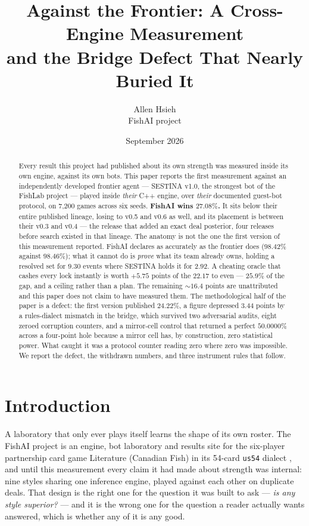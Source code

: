 \documentclass[11pt]{article}
\title{Against the Frontier: A Cross-Engine Measurement\\ and the Bridge Defect That Nearly Buried It}
\author{Allen Hsieh\\[2pt] {\small FishAI project}}
\date{September 2026}
\newcommand{\code}[1]{\texttt{#1}}
\newcommand{\usff}{\code{us54}}
\begin{document}
\maketitle

\begin{abstract}
\noindent
Every result this project had published about its own strength was measured inside its own engine,
against its own bots. This paper reports the first measurement against an independently developed
frontier agent --- SESTINA v1.0, the strongest bot of the FishLab project \cite{fishlab} --- played
inside \emph{their} C++ engine, over \emph{their} documented guest-bot protocol, on 7{,}200 games
across six seeds. \textbf{FishAI wins $27.08\%$.} It sits below their entire published lineage,
losing to v0.5 and v0.6 as well, and its placement is between their v0.3 and v0.4 --- the release
that added an exact deal posterior, four releases before search existed in that lineage.
The anatomy is not the one the first version of this measurement reported. FishAI declares as
accurately as the frontier does ($98.42\%$ against $98.46\%$); what it cannot do is \emph{prove}
what its team already owns, holding a resolved set for $9.30$ events where SESTINA holds it for
$2.92$. A cheating oracle that cashes every lock instantly is worth $+5.75$ points of the $22.17$
to even --- $25.9\%$ of the gap, and a ceiling rather than a plan. The remaining ${\sim}16.4$ points
are unattributed and this paper does not claim to have measured them. The methodological half of
the paper is a defect: the first version published $24.22\%$, a figure depressed $3.44$ points by a
rules-dialect mismatch in the bridge, which survived two adversarial audits, eight zeroed corruption
counters, and a mirror-cell control that returned a perfect $50.0000\%$ across a four-point hole
because a mirror cell has, by construction, zero statistical power. What caught it was a protocol
counter reading zero where zero was impossible. We report the defect, the withdrawn numbers, and
three instrument rules that follow.
\end{abstract}

\section{Introduction}
\label{sec:intro}

A laboratory that only ever plays itself learns the shape of its own roster. The FishAI project
\cite{v05, v20} is an engine, bot laboratory and results site for the six-player partnership card
game Literature (Canadian Fish) in its 54-card \usff{} dialect \cite{rules}, and until this
measurement every claim it had made about strength was internal: nine styles sharing one inference
engine, played against each other on duplicate deals. That design is the right one for the question
it was built to ask --- \emph{is any style superior?} --- and it is the wrong one for the question a
reader actually wants answered, which is whether any of it is any good.
\end{document}
